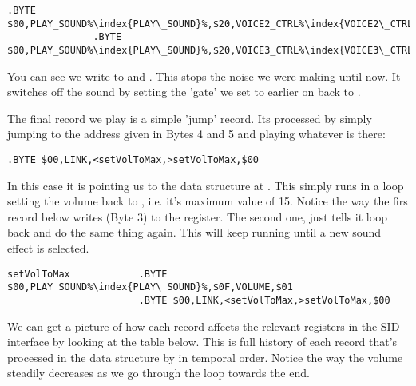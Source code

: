 \begin{lstlisting}[escapechar=\%]
               .BYTE $00,PLAY_SOUND%\index{PLAY\_SOUND}%,$20,VOICE2_CTRL%\index{VOICE2\_CTRL}%,$00
               .BYTE $00,PLAY_SOUND%\index{PLAY\_SOUND}%,$20,VOICE3_CTRL%\index{VOICE3\_CTRL}%,$00
\end{lstlisting}

You can see we write  to  and . This stops the noise we were making
until now. It switches off the sound by setting the 'gate' we set to  earlier on back to .

The final record we play is a simple 'jump' record. Its processed by simply jumping to the address given in Bytes 4 and
5 and playing whatever is there:

\begin{lstlisting}[escapechar=\%]
              .BYTE $00,LINK,<setVolToMax,>setVolToMax,$00
\end{lstlisting}

In this case it is pointing us to the data structure at . This simply runs in a loop setting the volume
back to , i.e. it's maximum value of 15. Notice the way the firs record below writes  (Byte 3) to the
 register. The second one, just tells it loop back and do the same thing again. This will keep running until
a new sound effect is selected.

\begin{lstlisting}[escapechar=\%]
setVolToMax            .BYTE $00,PLAY_SOUND%\index{PLAY\_SOUND}%,$0F,VOLUME,$01
                       .BYTE $00,LINK,<setVolToMax,>setVolToMax,$00
\end{lstlisting}

We can get a picture of how each record affects the relevant registers in the SID interface by looking at the table below.
This is full history of each record that's processed in the  data structure by 
in temporal order. Notice the way the volume steadily decreases as we go through the  loop towards the end.

